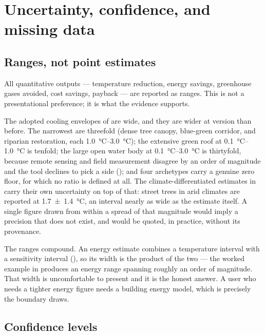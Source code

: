 \section{Uncertainty, confidence, and missing data}
\label{sec:uncertainty}

\subsection{Ranges, not point estimates}

All quantitative outputs --- temperature reduction, energy savings, greenhouse
gases avoided, cost savings, payback --- are reported as ranges. This is not a
presentational preference; it is what the evidence supports.

The adopted cooling envelopes of  are wide, and they are
wider at version \methver{} than before. The narrowest are threefold (dense
tree canopy, blue-green corridor, and riparian restoration, each
\SIrange{1.0}{3.0}{\degreeCelsius}); the extensive green roof at
\SIrange{0.1}{1.0}{\degreeCelsius} is tenfold; the large open water body at
\SIrange{0.1}{3.0}{\degreeCelsius} is thirtyfold, because remote sensing and
field measurement disagree by an order of magnitude and the tool declines to
pick a side (); and four archetypes carry a genuine zero
floor, for which no ratio is defined at all. The
climate-differentiated estimates in \textcite{keravec2026} carry their own
uncertainty on top of that: street trees in arid climates are reported at
\qty{1.7(14)}{\degreeCelsius}, an interval nearly as wide as the estimate
itself. A single figure drawn from within a spread of that magnitude would
imply a precision that does not exist, and would be quoted, in practice,
without its provenance.

The ranges compound. An energy estimate combines a temperature interval with a
sensitivity interval (), so its width is the product of
the two --- the worked example in  produces an energy
range spanning roughly an order of magnitude. That width is uncomfortable to
present and it is the honest answer. A user who needs a tighter energy figure
needs a building energy model, which is precisely the boundary
 draws.

\subsection{Confidence levels}
\label{sec:confidence-levels}

